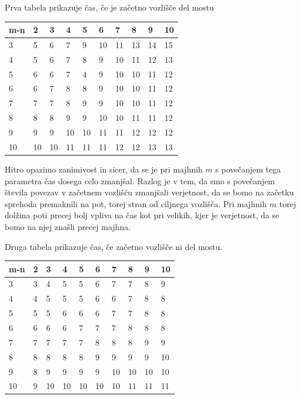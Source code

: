 \documentclass[12pt,a4paper]{amsart}
\begin{document}
Prva tabela prikazuje čas, če je začetno vozlišče del mostu

\begin{table}[!ht]
    \centering
    \begin{tabular}{|l|l|l|l|l|l|l|l|l|l|}
    \hline
        m-n & 2 & 3 & 4 & 5 & 6 & 7 & 8 & 9 & 10 \\ \hline
        3 & 5 & 6 & 7 & 9 & 10 & 11 & 13 & 14 & 15 \\ \hline
        4 & 5 & 6 & 7 & 8 & 9 & 10 & 11 & 12 & 13 \\ \hline
        5 & 6 & 6 & 7 & 4 & 9 & 10 & 10 & 11 & 12 \\ \hline
        6 & 6 & 7 & 8 & 8 & 9 & 10 & 10 & 11 & 12 \\ \hline
        7 & 7 & 7 & 8 & 9 & 9 & 10 & 10 & 11 & 12 \\ \hline
        8 & 8 & 8 & 9 & 9 & 10 & 10 & 11 & 11 & 12 \\ \hline
        9 & 9 & 9 & 10 & 10 & 11 & 11 & 12 & 12 & 12 \\ \hline
        10 & 10 & 10 & 11 & 11 & 11 & 12 & 12 & 13 & 13 \\ \hline
    \end{tabular}
\end{table}

Hitro opazimo zanimivost in sicer, da se je pri majhnih $m$ s povečanjem tega parametra čas dosega celo zmanjšal. Razlog
je v tem, da smo s povečanjem števila povezav v začetnem vozlišču zmanjšali verjetnost, da se bomo na začetku sprehoda
premaknili na pot, torej stran od ciljnega vozlišča. Pri majhnih $m$ torej dolžina poti precej bolj vpliva na čas kot pri
velikih, kjer je verjetnost, da se bomo na njej znašli precej majhna.

Druga tabela prikazuje čas, če začetno vozlišče ni del mostu.

\begin{table}[!ht]
    \centering
    \begin{tabular}{|l|l|l|l|l|l|l|l|l|l|}
    \hline
        m-n & 2 & 3 & 4 & 5 & 6 & 7 & 8 & 9 & 10 \\ \hline
        3 & 3 & 4 & 5 & 5 & 6 & 7 & 7 & 8 & 9 \\ \hline
        4 & 4 & 5 & 5 & 5 & 6 & 6 & 7 & 8 & 8 \\ \hline
        5 & 5 & 5 & 6 & 6 & 6 & 7 & 7 & 8 & 8 \\ \hline
        6 & 6 & 6 & 6 & 7 & 7 & 7 & 8 & 8 & 8 \\ \hline
        7 & 7 & 7 & 7 & 7 & 8 & 8 & 8 & 9 & 9 \\ \hline
        8 & 8 & 8 & 8 & 8 & 9 & 9 & 9 & 9 & 10 \\ \hline
        9 & 8 & 9 & 9 & 9 & 9 & 10 & 10 & 10 & 10 \\ \hline
        10 & 9 & 10 & 10 & 10 & 10 & 10 & 11 & 11 & 11 \\ \hline
    \end{tabular}
\end{table}
\end{document}
